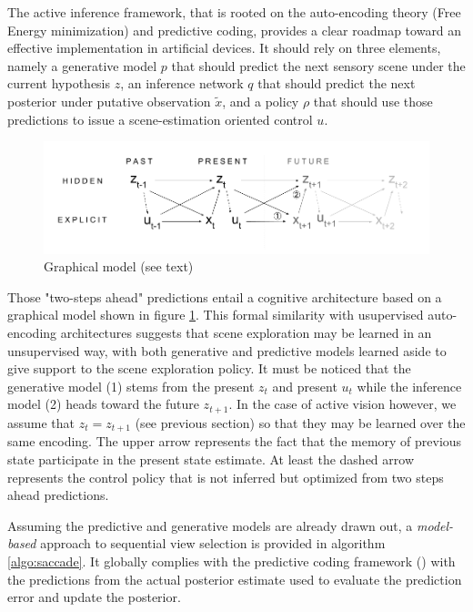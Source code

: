 \documentclass{article} %
\begin{document}
The active inference framework, that is rooted on the auto-encoding theory (Free Energy minimization) and predictive coding, provides a clear roadmap toward an effective implementation in artificial devices. It should rely on three elements, namely a generative model $p$ that should predict the next sensory scene under the current hypothesis $z$, an inference network $q$ that should predict the next posterior under putative observation $\tilde{x}$, and a policy $\rho$ that should use those predictions to issue a scene-estimation oriented control $u$.  

\begin{figure}[t!]
	\centerline{
		\includegraphics[width = \linewidth]{img/ICLR-graphical.png} 
	}
	\caption{Graphical model (see text)}\label{fig:graphical}
\end{figure}

Those "two-steps ahead" predictions entail a cognitive architecture based on a graphical model shown in figure \ref{fig:graphical}.
This formal similarity with usupervised auto-encoding architectures suggests that scene exploration may be learned in an unsupervised way, with both generative and predictive models learned aside to give support to the scene exploration policy. It must be noticed that the generative model (1) stems from the present $z_t$ and present $u_t$ while the inference model (2) heads toward the future $z_{t+1}$.  In the case of active vision however, we assume that $z_t = z_{t+1}$ (see previous section) so that they may be learned over the same encoding. The upper arrow represents the fact that the memory of previous state participate in the present state estimate. At least the dashed arrow represents the control policy that is not inferred but optimized from two steps ahead predictions.

Assuming the predictive and generative models are already drawn out, a \emph{model-based} approach to sequential view selection is provided in algorithm \ref{algo:saccade}. It globally complies with the predictive coding framework (\cite{rao1999predictive}) with the predictions from the actual posterior estimate used to evaluate the prediction error and update the posterior.
\end{document}
